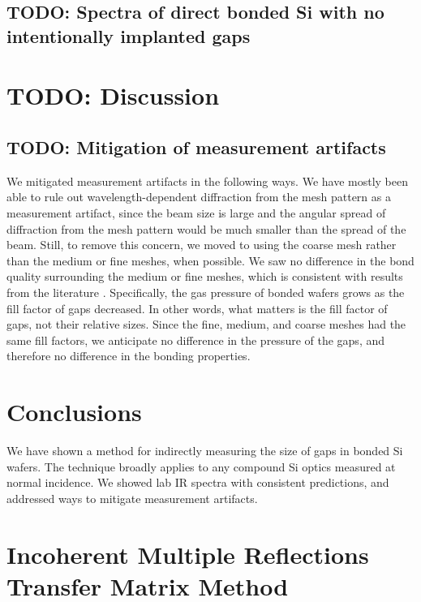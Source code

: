 \documentclass[osajnl,preprint,showpacs,superscriptaddress,12pt]{revtex4-1} %
\begin{document}
\subsection{TODO: Spectra of direct bonded Si with no intentionally implanted gaps}
\section{TODO: Discussion}

\subsection{TODO: Mitigation of measurement artifacts}
We mitigated measurement artifacts in the following ways.  We have mostly been able to rule out wavelength-dependent diffraction from the mesh pattern as a measurement artifact, since the beam size is large and the angular spread of diffraction from the mesh pattern would be much smaller than the spread of the beam.  Still, to remove this concern, we moved to using the coarse mesh rather than the medium or fine meshes, when possible.  We saw no difference in the bond quality surrounding the medium or fine meshes, which is consistent with results from the literature \cite{1992JEMat..21..669M}.  Specifically, the gas pressure of bonded wafers grows as the fill factor of gaps decreased.  In other words, what matters is the fill factor of gaps, not their relative sizes.  Since the fine, medium, and coarse meshes had the same fill factors, we anticipate no difference in the pressure of the gaps, and therefore no difference in the bonding properties.


\section{Conclusions}
We have shown a method for indirectly measuring the size of gaps in bonded Si wafers.  The technique broadly applies to any compound Si optics measured at normal incidence.  We showed lab IR spectra with consistent predictions, and addressed ways to mitigate measurement artifacts. 

\appendix

\section{Incoherent Multiple Reflections Transfer Matrix Method}
\label{sec:Append-IMRTMM}
\end{document}
